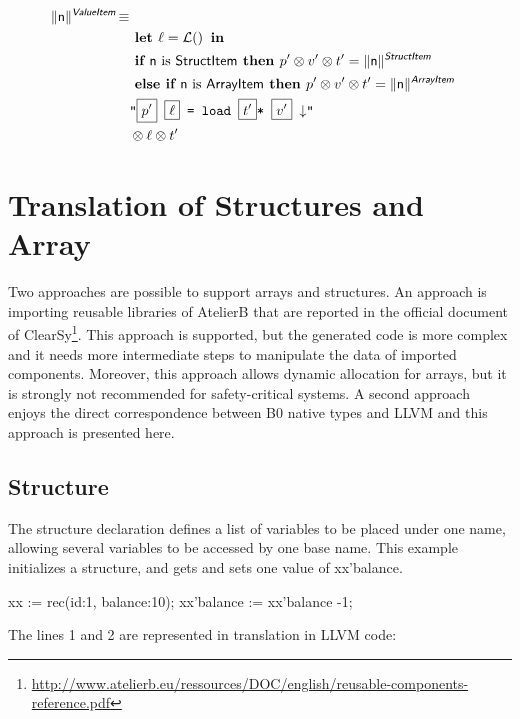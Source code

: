 \begin{align*}
\begin{split}
  \trad{n}{\B{ValueItem}} \isdef \\
   & \LET \ell = \lbl  \IN\\
   & \IF \B{n} \mbox{ is \B{StructItem}} \THEN p' \sep v' \sep t' = \trad{\B{n}}{\B{StructItem}} \\
   & \ELSIF \B{n} \mbox{ is \B{ArrayItem}} \THEN p' \sep v' \sep t' = \trad{\B{n}}{\B{ArrayItem}} \\
   & \llvm{"\PH{p'} \PH{\ell}  = load  \PH{t'}* \PH{v'} \nl"} \\
   & \sep  \ell  \sep t'\\
\end{split}
\end{align*}


\section{Translation of Structures and Array}

Two approaches are possible to support arrays and structures. An approach is 
importing reusable libraries of AtelierB that are reported in the official 
document of ClearSy\footnote{\url{http://www.atelierb.eu/ressources/DOC/english/reusable-components-reference.pdf}}. 
This approach is supported, but the generated code is more complex and it needs 
more intermediate steps to manipulate the data of imported components. 
Moreover, this approach allows dynamic allocation for arrays, but it is 
strongly not recommended for safety-critical systems. A second approach enjoys 
the direct correspondence between B0 native types and LLVM and this approach 
is presented here.

\subsection{Structure} 
The structure declaration defines a list of variables to be placed under one 
name, allowing several variables to be accessed by one base name. This example  
initializes a structure, and gets and sets one value of xx'balance. 
 
\begin{ccode}
xx := rec(id:1, balance:10);
xx'balance := xx'balance -1;
\end{ccode}
The lines 1 and 2 are represented in translation in LLVM code:

